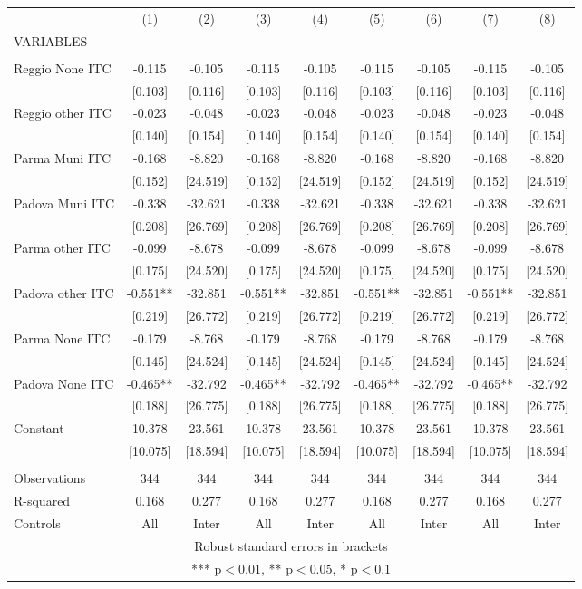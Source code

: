 \begin{tabular}{lcccccccc} \hline
 & (1) & (2) & (3) & (4) & (5) & (6) & (7) & (8) \\
VARIABLES &  &  &  &  &  &  &  &  \\ \hline
 &  &  &  &  &  &  &  &  \\
Reggio None ITC & -0.115 & -0.105 & -0.115 & -0.105 & -0.115 & -0.105 & -0.115 & -0.105 \\
 & [0.103] & [0.116] & [0.103] & [0.116] & [0.103] & [0.116] & [0.103] & [0.116] \\
Reggio other ITC & -0.023 & -0.048 & -0.023 & -0.048 & -0.023 & -0.048 & -0.023 & -0.048 \\
 & [0.140] & [0.154] & [0.140] & [0.154] & [0.140] & [0.154] & [0.140] & [0.154] \\
Parma Muni ITC & -0.168 & -8.820 & -0.168 & -8.820 & -0.168 & -8.820 & -0.168 & -8.820 \\
 & [0.152] & [24.519] & [0.152] & [24.519] & [0.152] & [24.519] & [0.152] & [24.519] \\
Padova Muni ITC & -0.338 & -32.621 & -0.338 & -32.621 & -0.338 & -32.621 & -0.338 & -32.621 \\
 & [0.208] & [26.769] & [0.208] & [26.769] & [0.208] & [26.769] & [0.208] & [26.769] \\
Parma other ITC & -0.099 & -8.678 & -0.099 & -8.678 & -0.099 & -8.678 & -0.099 & -8.678 \\
 & [0.175] & [24.520] & [0.175] & [24.520] & [0.175] & [24.520] & [0.175] & [24.520] \\
Padova other ITC & -0.551** & -32.851 & -0.551** & -32.851 & -0.551** & -32.851 & -0.551** & -32.851 \\
 & [0.219] & [26.772] & [0.219] & [26.772] & [0.219] & [26.772] & [0.219] & [26.772] \\
Parma None ITC & -0.179 & -8.768 & -0.179 & -8.768 & -0.179 & -8.768 & -0.179 & -8.768 \\
 & [0.145] & [24.524] & [0.145] & [24.524] & [0.145] & [24.524] & [0.145] & [24.524] \\
Padova None ITC & -0.465** & -32.792 & -0.465** & -32.792 & -0.465** & -32.792 & -0.465** & -32.792 \\
 & [0.188] & [26.775] & [0.188] & [26.775] & [0.188] & [26.775] & [0.188] & [26.775] \\
Constant & 10.378 & 23.561 & 10.378 & 23.561 & 10.378 & 23.561 & 10.378 & 23.561 \\
 & [10.075] & [18.594] & [10.075] & [18.594] & [10.075] & [18.594] & [10.075] & [18.594] \\
 &  &  &  &  &  &  &  &  \\
Observations & 344 & 344 & 344 & 344 & 344 & 344 & 344 & 344 \\
R-squared & 0.168 & 0.277 & 0.168 & 0.277 & 0.168 & 0.277 & 0.168 & 0.277 \\
 Controls & All & Inter & All & Inter & All & Inter & All & Inter \\ \hline
\multicolumn{9}{c}{ Robust standard errors in brackets} \\
\multicolumn{9}{c}{ *** p$<$0.01, ** p$<$0.05, * p$<$0.1} \\
\end{tabular}
